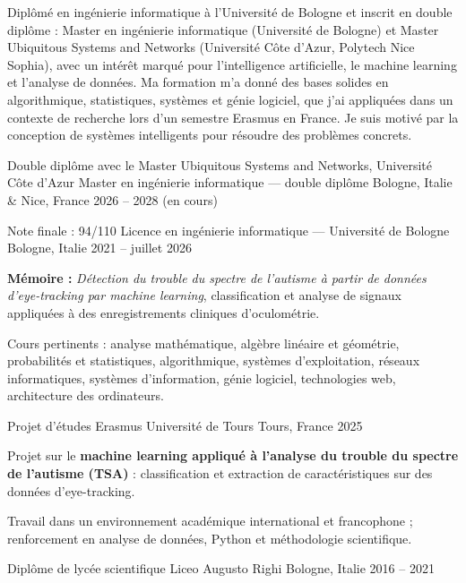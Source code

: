 \documentclass[11pt, a4paper]{../awesome-cv}
\begin{document}
\makecvheader[C]


\begin{cvparagraph}
Diplômé en ingénierie informatique à l'Université de Bologne et inscrit en double diplôme : Master en ingénierie
informatique (Université de Bologne) et Master Ubiquitous Systems and Networks (Université Côte d'Azur, Polytech Nice
Sophia), avec un intérêt marqué pour l'intelligence artificielle, le machine learning et l'analyse de données. Ma
formation m'a donné des bases solides en algorithmique, statistiques, systèmes et génie logiciel, que j'ai appliquées
dans un contexte de recherche lors d'un semestre Erasmus en France. Je suis motivé par la conception de systèmes
intelligents pour résoudre des problèmes concrets.
\end{cvparagraph}

\begin{cventries}
  \cventry
    {Double diplôme avec le Master Ubiquitous Systems and Networks, Université Côte d'Azur}
    {Master en ingénierie informatique — double diplôme}
    {Bologne, Italie \& Nice, France}
    {2026 -- 2028 (en cours)}
    {}

  \cventry
    {Note finale : 94/110}
    {Licence en ingénierie informatique — Université de Bologne}
    {Bologne, Italie}
    {2021 -- juillet 2026}
    {
      \begin{cvitems}
        \item {\textbf{Mémoire :} \textit{Détection du trouble du spectre de l'autisme à partir de données d'eye-tracking par machine learning}, classification et analyse de signaux appliquées à des enregistrements cliniques d'oculométrie.}
        \item {Cours pertinents : analyse mathématique, algèbre linéaire et géométrie, probabilités et statistiques, algorithmique, systèmes d'exploitation, réseaux informatiques, systèmes d'information, génie logiciel, technologies web, architecture des ordinateurs.}
      \end{cvitems}
    }

  \cventry
    {Projet d'études Erasmus}
    {Université de Tours}
    {Tours, France}
    {2025}
    {
      \begin{cvitems}
        \item {Projet sur le \textbf{machine learning appliqué à l'analyse du trouble du spectre de l'autisme (TSA)} : classification et extraction de caractéristiques sur des données d'eye-tracking.}
        \item {Travail dans un environnement académique international et francophone ; renforcement en analyse de données, Python et méthodologie scientifique.}
      \end{cvitems}
    }

  \cventry
    {Diplôme de lycée scientifique}
    {Liceo Augusto Righi}
    {Bologne, Italie}
    {2016 -- 2021}
    {}
\end{cventries}
\end{document}
